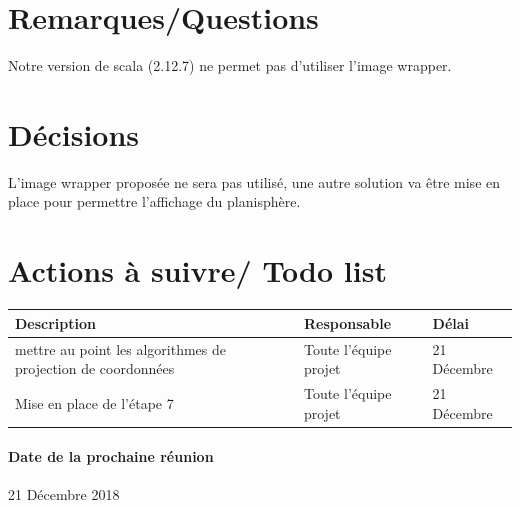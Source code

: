 \documentclass{article}
\begin{document}
\section{Remarques/Questions}
 Notre version de scala (2.12.7) ne permet pas d'utiliser l'image wrapper.
\section{Décisions}
L'image wrapper proposée ne sera pas utilisé, une autre solution va être mise en place pour permettre l'affichage du planisphère.
\section{Actions à suivre/ Todo list}

\begin{tabular}{|C{5cm}|C{3cm}|C{3cm}|}
\hline {} Description & Responsable & Délai \\
\hline  mettre au point les algorithmes de projection de coordonnées & Toute l'équipe projet  & 21 Décembre  \\
\hline 
Mise en place de l'étape 7 & Toute l'équipe projet  & 21 Décembre \\
\hline
\end{tabular}

\paragraph{Date de la prochaine réunion}
21 Décembre 2018
\end{document}
